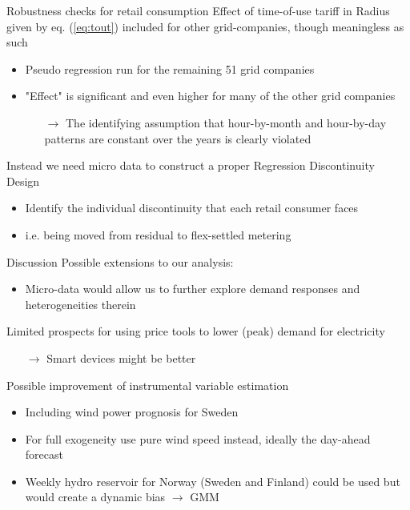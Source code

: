 \begin{frame}{Robustness checks for retail consumption}
Effect of time-of-use tariff in Radius given by eq. (\ref{eq:tout}) included for other grid-companies, though meaningless as such
\begin{itemize}
    \item Pseudo regression run for the remaining 51 grid companies
    \item "Effect" is significant and even higher for many of the other grid companies
    \begin{itemize}
        \normalsize
        \item[$\rightarrow$] The identifying assumption that hour-by-month and hour-by-day patterns are constant over the years is clearly violated
    \end{itemize}
\end{itemize}
Instead we need micro data to construct a proper Regression Discontinuity Design
\begin{itemize}
    \item Identify the individual discontinuity that each retail consumer faces
    \item i.e. being moved from residual to flex-settled metering
\end{itemize}
\end{frame}

\begin{frame}{Discussion}
Possible extensions to our analysis:
\begin{itemize}
    \item Micro-data would allow us to further explore demand responses and heterogeneities therein
\end{itemize}
Limited prospects for using price tools to lower (peak) demand for electricity
\begin{itemize}
    \item[$\rightarrow$] Smart devices might be better
\end{itemize}
Possible improvement of instrumental variable estimation
\begin{itemize}
    \item Including wind power prognosis for Sweden
    \item For full exogeneity use pure wind speed instead, ideally the day-ahead forecast
    \item Weekly hydro reservoir for Norway (Sweden and Finland) could be used but would create a dynamic bias $\rightarrow$ GMM
\end{itemize}
\end{frame}


